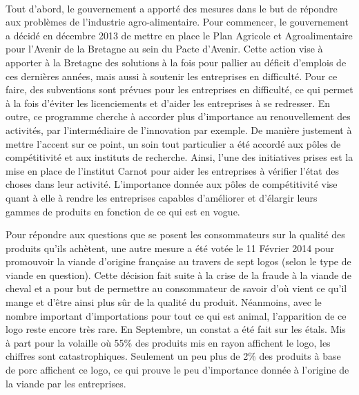 \documentclass[a4paper,12pt]{report}
\begin{document}
			\paragraph{}Tout d’abord, le gouvernement a apporté des mesures dans le but de répondre aux problèmes de l’industrie agro-alimentaire. Pour commencer, le gouvernement a décidé en décembre 2013 de mettre en place le Plan Agricole et Agroalimentaire pour l’Avenir de la Bretagne au sein du Pacte d’Avenir\cite{PacteAvenirBretagne}. Cette action vise à apporter à la Bretagne des solutions à la fois pour pallier au déficit d’emplois de ces dernières années, mais aussi à soutenir les entreprises en difficulté. Pour ce faire, des subventions sont prévues pour les entreprises en difficulté, ce qui permet à la fois d’éviter les licenciements et d’aider les entreprises à se redresser. En outre, ce programme cherche à accorder plus d’importance au renouvellement des activités, par l’intermédiaire de l’innovation par exemple. De manière justement à mettre l’accent sur ce point, un soin tout particulier a été accordé aux pôles de compétitivité et aux instituts de recherche. Ainsi, l'une des initiatives prises est la mise en place de l’institut Carnot pour aider les entreprises à vérifier l’état des choses dans leur activité. L’importance donnée aux pôles de compétitivité vise quant à elle à rendre les entreprises capables d’améliorer et d’élargir leurs gammes de produits en fonction de ce qui est en vogue.

			Pour répondre aux questions que se posent les consommateurs sur la qualité des produits qu’ils achètent, une autre mesure a été votée le 11 Février 2014 pour promouvoir la viande d’origine française au travers de sept logos (selon le type de viande en question). Cette décision fait suite à la crise de la fraude à la viande de cheval et a pour but de permettre au consommateur de savoir d’où vient ce qu’il mange et d’être ainsi plus sûr de la qualité du produit. Néanmoins, avec le nombre important d’importations pour tout ce qui est animal, l’apparition de ce logo reste encore très rare. En Septembre, un constat a été fait sur les étals. Mis à part pour la volaille où 55\% des produits mis en rayon affichent le logo, les chiffres sont catastrophiques. Seulement un peu plus de 2\% des produits à base de porc affichent ce logo, ce qui prouve le peu d’importance donnée à l’origine de la viande par les entreprises\cite{FlopVDF}.

\end{document}
